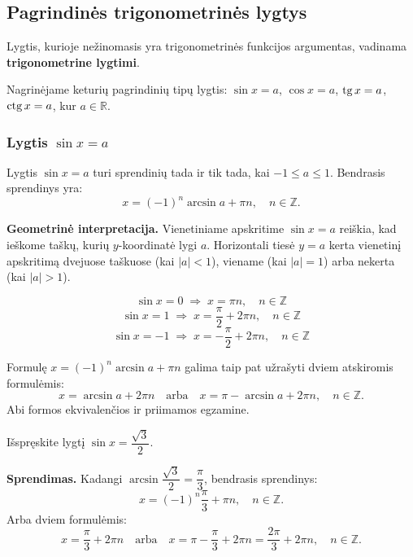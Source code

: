\subsection{Pagrindinės trigonometrinės lygtys}

\begin{definition}
Lygtis, kurioje nežinomasis yra trigonometrinės funkcijos argumentas, vadinama 
\textbf{trigonometrine lygtimi}.
\end{definition}

\noindent Nagrinėjame keturių pagrindinių tipų lygtis: $\sin x = a$, $\cos x = a$, 
$\operatorname{tg} x = a$, $\operatorname{ctg} x = a$, kur $a \in \mathbb{R}$.

\subsubsection*{Lygtis \(\sin x = a\)}

\begin{theorem}
Lygtis $\sin x = a$ turi sprendinių tada ir tik tada, kai $-1 \leq a \leq 1$. 
Bendrasis sprendinys yra:
\[
    x = (-1)^n \arcsin a + \pi n, \quad n \in \mathbb{Z}.
\]
\end{theorem}

\noindent \textbf{Geometrinė interpretacija.} Vienetiniame apskritime $\sin x = a$ 
reiškia, kad ieškome taškų, kurių $y$-koordinatė lygi $a$. Horizontali tiesė 
$y = a$ kerta vienetinį apskritimą dvejuose taškuose (kai $|a| < 1$), viename 
(kai $|a| = 1$) arba nekerta (kai $|a| > 1$).

\begin{tcolorbox}[colback=blue!5, colframe=blue!50!black, title=Ypatingos reikšmės]
\[
\sin x = 0 \;\Rightarrow\; x = \pi n, \quad n \in \mathbb{Z}
\]
\[
\sin x = 1 \;\Rightarrow\; x = \frac{\pi}{2} + 2\pi n, \quad n \in \mathbb{Z}
\]
\[
\sin x = -1 \;\Rightarrow\; x = -\frac{\pi}{2} + 2\pi n, \quad n \in \mathbb{Z}
\]
\end{tcolorbox}

\begin{remark}
Formulę $x = (-1)^n \arcsin a + \pi n$ galima taip pat užrašyti dviem atskiromis 
formulėmis:
\[
    x = \arcsin a + 2\pi n \quad \text{arba} \quad x = \pi - \arcsin a + 2\pi n, 
    \quad n \in \mathbb{Z}.
\]
Abi formos ekvivalenčios ir priimamos egzamine.
\end{remark}

\begin{example}
Išspręskite lygtį $\sin x = \dfrac{\sqrt{3}}{2}$.

\textbf{Sprendimas.} Kadangi $\arcsin\dfrac{\sqrt{3}}{2} = \dfrac{\pi}{3}$, 
bendrasis sprendinys:
\[
    x = (-1)^n \frac{\pi}{3} + \pi n, \quad n \in \mathbb{Z}.
\]
Arba dviem formulėmis:
\[
    x = \frac{\pi}{3} + 2\pi n \quad \text{arba} \quad x = \pi - \frac{\pi}{3} + 2\pi n 
    = \frac{2\pi}{3} + 2\pi n, \quad n \in \mathbb{Z}.
\]
\end{example}

